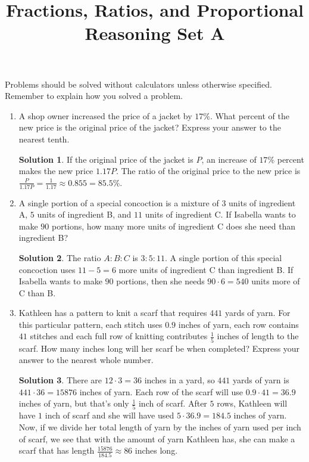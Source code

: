 \documentclass{article}
\title{Fractions, Ratios, and Proportional Reasoning Set A}
\author{}
\date{}
\theoremstyle{definition}
\newtheorem*{solution}{Solution}
\begin{document}
    \maketitle
    \noindent Problems should be solved without calculators unless otherwise specified. Remember to explain how you solved a problem.
    \begin{enumerate}
        \item A shop owner increased the price of a jacket by $17\%$. What percent of the new price is the original price of the jacket? Express your answer to the nearest tenth.
        \begin{solution}
            If the original price of the jacket is $P$, an increase of $17\%$ percent makes the new price $1.17P$. The ratio of the original price to the new price is $\frac{P}{1.17P} = \frac{1}{1.17} \approx 0.855 = 85.5\%$.
        \end{solution}
        \item A single portion of a special concoction is a mixture of $3$ units of ingredient A, $5$ units of ingredient B, and $11$ units of ingredient C. If Isabella wants to make $90$ portions, how many more units of ingredient C does she need than ingredient B?
        \begin{solution}
            The ratio $A : B : C$ is $3 : 5 : 11$. A single portion of this special concoction uses $11 - 5 = 6$ more units of ingredient C than ingredient B. If Isabella wants to make $90$ portions, then she needs $90 \cdot 6 = 540$ units more of C than B.
        \end{solution}
        \item Kathleen has a pattern to knit a scarf that requires $441$ yards of yarn. For this particular pattern, each stitch uses $0.9$ inches of yarn, each row contains $41$ stitches and each full row of knitting contributes $\frac{1}{5}$ inches of length to the scarf. How many inches long will her scarf be when completed? Express your answer to the nearest whole number.
        \begin{solution}
            There are $12 \cdot 3 = 36$ inches in a yard, so $441$ yards of yarn is $441 \cdot 36 = 15876$ inches of yarn. Each row of the scarf will use $0.9 \cdot 41 = 36.9$ inches of yarn, but that’s only $\frac{1}{5}$ inch of scarf. After $5$ rows, Kathleen will have $1$ inch of scarf and she will have used $5 \cdot 36.9 = 184.5$ inches of yarn. Now, if we divide her total length of yarn by the inches of yarn used per inch of scarf, we see that with the amount of yarn Kathleen has, she can make a scarf that has length $\frac{15876}{184.5} \approx 86$ inches long.

\end{solution}
\end{enumerate}
\end{document}
